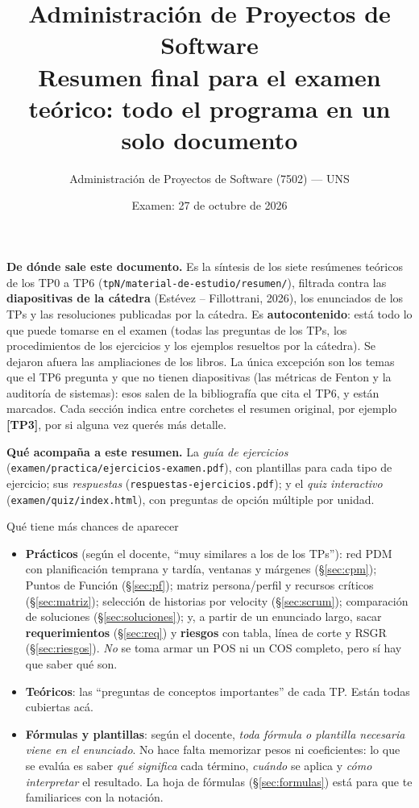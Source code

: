 \documentclass[11pt,a4paper]{article}
\title{\vspace{-1.6cm}\textbf{Administración de Proyectos de Software}\\[4pt]
\large Resumen final para el examen teórico: todo el programa en un solo documento}
\author{\normalsize Administración de Proyectos de Software (7502) --- UNS}
\date{\normalsize Examen: 27 de octubre de 2026}
\begin{document}
\maketitle
\thispagestyle{empty}

\begin{yavisto}
\textbf{De dónde sale este documento.} Es la síntesis de los siete resúmenes teóricos de los TP0 a TP6
(\texttt{tpN/material-de-estudio/resumen/}), filtrada contra las \textbf{diapositivas de la cátedra} (Estévez --
Fillottrani, 2026), los enunciados de los TPs y las resoluciones publicadas por la cátedra. Es
\textbf{autocontenido}: está todo lo que puede tomarse en el examen (todas las preguntas de los TPs, los
procedimientos de los ejercicios y los ejemplos resueltos por la cátedra). Se dejaron afuera las ampliaciones
de los libros. La única excepción son los temas que el TP6 pregunta y que no tienen diapositivas (las métricas
de Fenton y la auditoría de sistemas): esos salen de la bibliografía que cita el TP6, y están marcados. Cada sección indica entre corchetes
el resumen original, por ejemplo \textbf{[TP3]}, por si alguna vez querés más detalle.

\smallskip
\textbf{Qué acompaña a este resumen.} La \emph{guía de ejercicios} (\texttt{examen/practica/ejercicios-examen.pdf}),
con plantillas para cada tipo de ejercicio; sus \emph{respuestas} (\texttt{respuestas-ejercicios.pdf}); y el
\emph{quiz interactivo} (\texttt{examen/quiz/index.html}), con preguntas de opción múltiple por unidad.
\end{yavisto}

\begin{aviso}{Qué tiene más chances de aparecer}
\begin{itemize}
  \item \textbf{Prácticos} (según el docente, ``muy similares a los de los TPs''): red PDM con planificación
  temprana y tardía, ventanas y márgenes (§\ref{sec:cpm}); Puntos de Función (§\ref{sec:pf}); matriz
  persona/perfil y recursos críticos (§\ref{sec:matriz}); selección de historias por velocity
  (§\ref{sec:scrum}); comparación de soluciones (§\ref{sec:soluciones}); y, a partir de un enunciado largo,
  sacar \textbf{requerimientos} (§\ref{sec:req}) y \textbf{riesgos} con tabla, línea de corte y RSGR
  (§\ref{sec:riesgos}). \emph{No} se toma armar un POS ni un COS completo, pero sí hay que saber qué son.
  \item \textbf{Teóricos}: las ``preguntas de conceptos importantes'' de cada TP. Están todas cubiertas acá.
  \item \textbf{Fórmulas y plantillas}: según el docente, \emph{toda fórmula o plantilla necesaria viene en el
  enunciado}. No hace falta memorizar pesos ni coeficientes: lo que se evalúa es saber \emph{qué significa}
  cada término, \emph{cuándo} se aplica y \emph{cómo interpretar} el resultado. La hoja de fórmulas
  (§\ref{sec:formulas}) está para que te familiarices con la notación.
\end{itemize}
\end{aviso}
\end{document}
